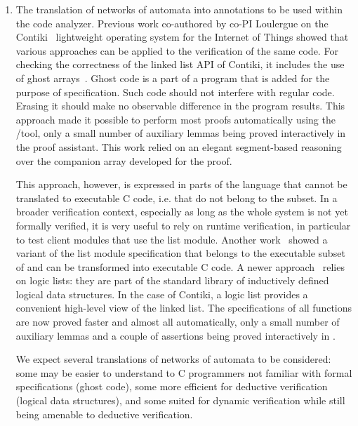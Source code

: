 \begin{enumerate}[labelsep=3pt,leftmargin=12pt]
\item The translation of networks of automata into annotations to be
  used within the \framac code analyzer. Previous work co-authored by
  co-PI Loulergue on the Contiki~\cite{DGV2004:LCN} lightweight
  operating system for the Internet of Things showed that various
  approaches can be applied to the verification of the same
  code. For checking the correctness of the linked list API of
  Contiki, it includes the use of ghost arrays~\cite{BKL2018:NFM}.
  Ghost code is a part of a program that is added for the purpose of
  specification. Such code should not interfere with regular
  code. Erasing it should make no observable difference in the program
  results. This approach made it possible to perform most proofs
  automatically using the \framac/\Wp tool, only a small number of
  auxiliary lemmas being proved interactively in the \Coq proof
  assistant.  This work relied on an elegant segment-based reasoning
  over the companion array developed for the proof.  
  
  This approach, however, is expressed in parts of the \acsl language that cannot be
  translated to executable C code, i.e. that do not belong to the
  \eacsl subset. In a broader verification context, especially
  as long as the whole system is not yet formally verified, it is very
  useful to rely on runtime verification, in particular to test client
  modules that use the list module. Another work~\cite{LBK2018:TAP}
  showed a variant of the list module specification that belongs to
  the executable subset \eacsl of \acsl and can be transformed into
  executable C code. A newer approach~\cite{BKL2019:SAC} relies on
  logic lists: they are part of the \acsl standard library of
  inductively defined logical data structures. In the case of Contiki,
  a logic list provides a convenient high-level view of the linked
  list.  The specifications of all functions are now proved faster and
  almost all automatically, only a small number of auxiliary lemmas
  and a couple of assertions being proved interactively in \Coq.
  
  We expect several translations of networks of automata to be
  considered: some may be easier to understand to C programmers not
  familiar with formal specifications (ghost code), some more efficient for
  deductive verification (logical data structures), and some suited
  for dynamic verification while still being amenable to deductive
  verification.


\end{enumerate}
